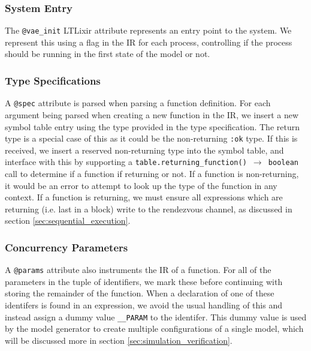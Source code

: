 \subsubsection{System Entry}
The \texttt{@vae\_init} LTLixir attribute represents an entry point to the system. We represent this using a flag in the IR for each process, controlling if the process should be running in the first state of the model or not.
\par
\subsubsection{Type Specifications}
A \texttt{@spec} attribute is parsed when parsing a function definition. For each argument being parsed when creating a new function in the IR, we insert a new symbol table entry using the type provided in the type specification. The return type is a special case of this as it could be the non-returning \texttt{:ok} type. If this is received, we insert a reserved non-returning type into the symbol table, and interface with this by supporting a \texttt{table.returning\_function() $\rightarrow$ boolean} call to determine if a function if returning or not. If a function is non-returning, it would be an error to attempt to look up the type of the function in any context. If a function is returning, we must ensure all expressions which are returning (i.e. last in a block) write to the rendezvous channel, as discussed in section \ref{sec:sequential_execution}.
\par
\subsubsection{Concurrency Parameters}
A \texttt{@params} attribute also instruments the IR of a function. For all of the parameters in the tuple of identifiers, we mark these before continuing with storing the remainder of the function. When a declaration of one of these identifers is found in an expression, we avoid the usual handling of this and instead assign a dummy value \texttt{\_\_PARAM} to the identifer. This dummy value is used by the model generator to create multiple configurations of a single model, which will be discussed more in section \ref{sec:simulation_verification}.
\par
